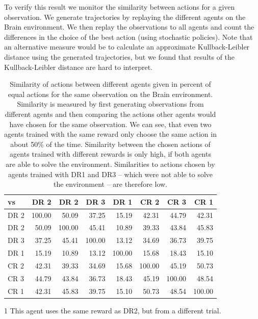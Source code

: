 To verify this result we monitor the similarity between actions for a given observation. We generate trajectories by replaying the different agents on the Brain environment. We then replay the observations to all agents and count the differences in the choice of the best action (using stochastic policies). Note that an alternative measure would be to calculate an approximate Kullback-Leibler distance using the generated trajectories, but we found that results of the Kullback-Leibler distance are hard to interpret.

\begin{table}[htp]
    \begin{center}
        \begin{threeparttable}
            \begin{tabular}{l|rrrrrrr}
                \toprule
                vs & DR 2 & DR 2\tnote{1} & DR 3 & DR 1 & CR 2 & CR 3 & CR 1 \\
                \midrule
                DR 2 & 100.00 & 50.09 & 37.25 & 15.19 & 42.31 & 44.79 & 42.31 \\
                DR 2\tnote{1} & 50.09 & 100.00 & 45.41 & 10.89 & 39.33 & 43.84 & 45.83 \\
                DR 3 & 37.25 & 45.41 & 100.00 & 13.12 & 34.69 & 36.73 & 39.75 \\
                DR 1 & 15.19 & 10.89 & 13.12 & 100.00 & 15.68 & 18.43 & 15.10 \\
                CR 2 & 42.31 & 39.33 & 34.69 & 15.68 & 100.00 & 45.19 & 50.73 \\
                CR 3 & 44.79 & 43.84 & 36.73 & 18.43 & 45.19 & 100.00 & 48.54 \\
                CR 1 & 42.31 & 45.83 & 39.75 & 15.10 & 50.73 & 48.54 & 100.00 \\
                \bottomrule
            \end{tabular}
            \begin{tablenotes} \footnotesize
                \item[1] This agent uses the same reward as DR2, but from a different trial.
            \end{tablenotes}
        \end{threeparttable}
    \end{center}
    \caption[Agent Action Similarity for Different Rewards]{Similarity of actions between different agents given in percent of equal actions for the same observation on the Brain environment. Similarity is measured by first generating observations from different agents and then comparing the actions other agents would have chosen for the same observation. We can see, that even two agents trained with the same reward only choose the same action in about 50\% of the time. Similarity between the chosen actions of agents trained with different rewards is only high, if both agents are able to solve the environment. Similarities to actions chosen by agents trained with DR1 and DR3 -- which were not able to solve the environment -- are therefore low.} \label{tab:Maze0122/Reward/Similarity}
\end{table}

